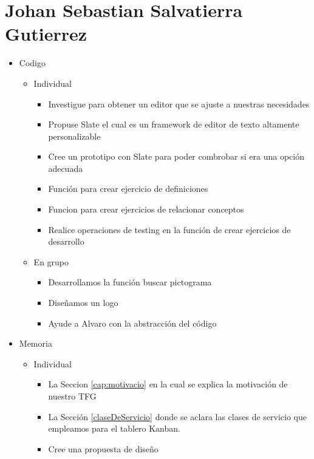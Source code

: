 \section{Johan Sebastian Salvatierra Gutierrez}
\begin{itemize}
    \item Codigo
        \begin{itemize}
            \item Individual
                \begin{itemize}
                    \item Investigue para obtener un editor que se ajuste a nuestras necesidades
                    \item Propuse Slate el cual es un framework de editor de texto altamente personalizable 
                    \item Cree un prototipo con Slate para poder combrobar si era una opción adecuada
                    \item Función para crear ejercicio de definiciones
                    \item Funcion para crear ejercicios de relacionar conceptos
                    \item Realice operaciones de testing en la función de crear ejercicios de desarrollo
                \end{itemize}
            \item En grupo
                \begin{itemize}
                    \item Desarrollamos la función buscar pictograma
                    \item Diseñamos un logo
                    \item Ayude a Alvaro con la abstracción del código
                \end{itemize}
        \end{itemize}
    \item Memoria
    \begin{itemize}
        \item Individual
            \begin{itemize}
                \item La Seccion \ref{cap:motivacio} en la cual se explica la motivación de nuestro TFG
                \item La Sección \ref{claseDeServicio} donde se aclara las clases de servicio que empleamos para el tablero Kanban.
                \item Cree una propuesta de diseño

\end{itemize}
\end{itemize}
\end{itemize}
